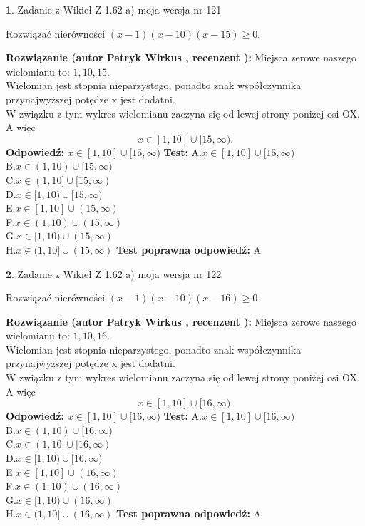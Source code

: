 \documentclass[12pt, a4paper]{article}
\theoremstyle{definition} %
\newtheorem{zad}{}
\newcommand{\zadStart}[1]{\begin{zad}#1\newline}
\newcommand{\zadStop}{\end{zad}}
\newcommand{\rozwStart}[2]{\noindent \textbf{Rozwiązanie (autor #1 , recenzent #2): }\newline}
\newcommand{\rozwStop}{\newline}
\newcommand{\odpStart}{\noindent \textbf{Odpowiedź:}\newline}
\newcommand{\odpStop}{\newline}
\newcommand{\testStart}{\noindent \textbf{Test:}\newline}
\newcommand{\testStop}{\newline}
\newcommand{\kluczStart}{\noindent \textbf{Test poprawna odpowiedź:}\newline}
\newcommand{\kluczStop}{\newline}
\begin{document}
\zadStart{Zadanie z Wikieł Z 1.62 a) moja wersja nr 121}

Rozwiązać nierówności $(x-1)(x-10)(x-15)\ge0$.
\zadStop
\rozwStart{Patryk Wirkus}{}
Miejsca zerowe naszego wielomianu to: $1, 10, 15$.\\
Wielomian jest stopnia nieparzystego, ponadto znak współczynnika przy\linebreak najwyższej potędze x jest dodatni.\\ W związku z tym wykres wielomianu zaczyna się od lewej strony poniżej osi OX. A więc $$x \in [1,10] \cup [15,\infty).$$
\rozwStop
\odpStart
$x \in [1,10] \cup [15,\infty)$
\odpStop
\testStart
A.$x \in [1,10] \cup [15,\infty)$\\
B.$x \in (1,10) \cup [15,\infty)$\\
C.$x \in (1,10] \cup [15,\infty)$\\
D.$x \in [1,10) \cup [15,\infty)$\\
E.$x \in [1,10] \cup (15,\infty)$\\
F.$x \in (1,10) \cup (15,\infty)$\\
G.$x \in [1,10) \cup (15,\infty)$\\
H.$x \in (1,10] \cup (15,\infty)$
\testStop
\kluczStart
A
\kluczStop



\zadStart{Zadanie z Wikieł Z 1.62 a) moja wersja nr 122}

Rozwiązać nierówności $(x-1)(x-10)(x-16)\ge0$.
\zadStop
\rozwStart{Patryk Wirkus}{}
Miejsca zerowe naszego wielomianu to: $1, 10, 16$.\\
Wielomian jest stopnia nieparzystego, ponadto znak współczynnika przy\linebreak najwyższej potędze x jest dodatni.\\ W związku z tym wykres wielomianu zaczyna się od lewej strony poniżej osi OX. A więc $$x \in [1,10] \cup [16,\infty).$$
\rozwStop
\odpStart
$x \in [1,10] \cup [16,\infty)$
\odpStop
\testStart
A.$x \in [1,10] \cup [16,\infty)$\\
B.$x \in (1,10) \cup [16,\infty)$\\
C.$x \in (1,10] \cup [16,\infty)$\\
D.$x \in [1,10) \cup [16,\infty)$\\
E.$x \in [1,10] \cup (16,\infty)$\\
F.$x \in (1,10) \cup (16,\infty)$\\
G.$x \in [1,10) \cup (16,\infty)$\\
H.$x \in (1,10] \cup (16,\infty)$
\testStop
\kluczStart
A
\kluczStop
\end{document}
